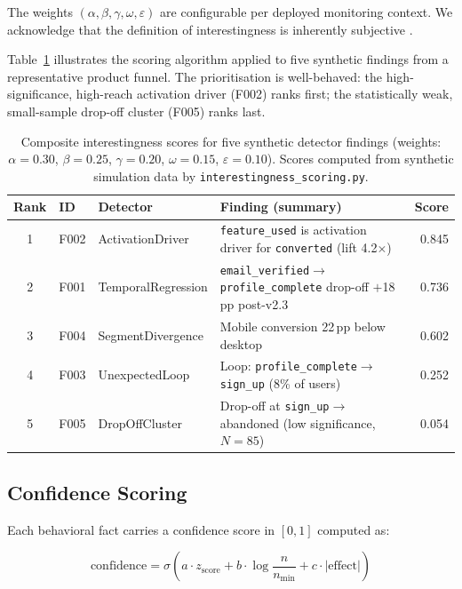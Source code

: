 \documentclass[12pt, a4paper]{article}
\begin{document}
The weights $(\alpha, \beta, \gamma, \omega, \varepsilon)$ are configurable per deployed monitoring context. We acknowledge that the definition of interestingness is inherently subjective \cite{silberschatz1995}.

Table~\ref{tab:scoring} illustrates the scoring algorithm applied to five synthetic findings from a representative product funnel. The prioritisation is well-behaved: the high-significance, high-reach activation driver (F002) ranks first; the statistically weak, small-sample drop-off cluster (F005) ranks last.

\begin{table}[htbp]
\centering
\caption{Composite interestingness scores for five synthetic detector findings
(weights: $\alpha{=}0.30$, $\beta{=}0.25$, $\gamma{=}0.20$, $\omega{=}0.15$,
$\varepsilon{=}0.10$). Scores computed from synthetic simulation data by
\texttt{interestingness\_scoring.py}.}
\label{tab:scoring}
\small
\begin{tabularx}{\linewidth}{cll>{\raggedright\arraybackslash}Xr}
\toprule
\textbf{Rank} & \textbf{ID} & \textbf{Detector} & \textbf{Finding (summary)} & \textbf{Score} \\
\midrule
1 & F002 & ActivationDriver   & \texttt{feature\_used} is activation driver for \texttt{converted} (lift 4.2$\times$) & 0.845 \\
2 & F001 & TemporalRegression & \texttt{email\_verified}$\to$\texttt{profile\_complete} drop-off $+$18\,pp post-v2.3  & 0.736 \\
3 & F004 & SegmentDivergence  & Mobile conversion 22\,pp below desktop                                               & 0.602 \\
4 & F003 & UnexpectedLoop     & Loop: \texttt{profile\_complete}$\to$\texttt{sign\_up} (8\% of users)                & 0.252 \\
5 & F005 & DropOffCluster     & Drop-off at \texttt{sign\_up}$\to$abandoned (low significance, $N{=}85$)             & 0.054 \\
\bottomrule
\end{tabularx}
\end{table}

\subsection{Confidence Scoring}

Each behavioral fact carries a confidence score in $[0, 1]$ computed as:

\begin{equation}
  \text{confidence} = \sigma\!\left(a \cdot z_{\text{score}} + b \cdot \log\frac{n}{n_{\min}} + c \cdot |\text{effect}|\right)
  \label{eq:confidence}
\end{equation}
\end{document}
